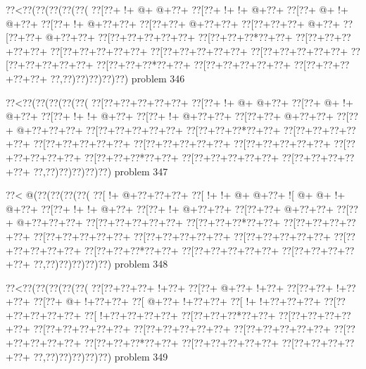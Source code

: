 \vbox{\vbox{\goo
\0??<\0??(\0??(\0??(\0??(\0??(
\0??[\0??+\- !+\- @+\- @+\0??+
\0??[\0??+\- !+\- !+\- @+\0??+
\0??[\0??+\- @+\- !+\- @+\0??+
\0??[\0??+\- !+\- @+\0??+\0??+
\0??[\0??+\0??+\- @+\0??+\0??+
\0??[\0??+\0??+\0??+\- @+\0??+
\0??[\0??+\0??+\- @+\0??+\0??+
\0??[\0??+\0??+\0??+\0??+\0??+
\0??[\0??+\0??+\0??*\0??+\0??+
\0??[\0??+\0??+\0??+\0??+\0??+
\0??[\0??+\0??+\0??+\0??+\0??+
\0??[\0??+\0??+\0??+\0??+\0??+
\0??[\0??+\0??+\0??+\0??+\0??+
\0??[\0??+\0??+\0??+\0??+\0??+
\0??[\0??+\0??+\0??*\0??+\0??+
\0??[\0??+\0??+\0??+\0??+\0??+
\0??[\0??+\0??+\0??+\0??+\0??+
\0??,\0??)\0??)\0??)\0??)\0??)
}
\hfil problem 346\hfil\break
}

\vbox{\vbox{\goo
\0??<\0??(\0??(\0??(\0??(\0??(
\0??[\0??+\0??+\0??+\0??+\0??+
\0??[\0??+\- !+\- @+\- @+\0??+
\0??[\0??+\- @+\- !+\- @+\0??+
\0??[\0??+\- !+\- !+\- @+\0??+
\0??[\0??+\- !+\- @+\0??+\0??+
\0??[\0??+\0??+\- @+\0??+\0??+
\0??[\0??+\- @+\0??+\0??+\0??+
\0??[\0??+\0??+\0??+\0??+\0??+
\0??[\0??+\0??+\0??*\0??+\0??+
\0??[\0??+\0??+\0??+\0??+\0??+
\0??[\0??+\0??+\0??+\0??+\0??+
\0??[\0??+\0??+\0??+\0??+\0??+
\0??[\0??+\0??+\0??+\0??+\0??+
\0??[\0??+\0??+\0??+\0??+\0??+
\0??[\0??+\0??+\0??*\0??+\0??+
\0??[\0??+\0??+\0??+\0??+\0??+
\0??[\0??+\0??+\0??+\0??+\0??+
\0??,\0??)\0??)\0??)\0??)\0??)
}
\hfil problem 347\hfil\break
}

\vbox{\vbox{\goo
\0??<\- @(\0??(\0??(\0??(\0??(
\0??[\- !+\- @+\0??+\0??+\0??+
\0??[\- !+\- !+\- @+\- @+\0??+
\- ![\- @+\- @+\- !+\- @+\0??+
\0??[\0??+\- !+\- !+\- @+\0??+
\0??[\0??+\- !+\- @+\0??+\0??+
\0??[\0??+\0??+\- @+\0??+\0??+
\0??[\0??+\- @+\0??+\0??+\0??+
\0??[\0??+\0??+\0??+\0??+\0??+
\0??[\0??+\0??+\0??*\0??+\0??+
\0??[\0??+\0??+\0??+\0??+\0??+
\0??[\0??+\0??+\0??+\0??+\0??+
\0??[\0??+\0??+\0??+\0??+\0??+
\0??[\0??+\0??+\0??+\0??+\0??+
\0??[\0??+\0??+\0??+\0??+\0??+
\0??[\0??+\0??+\0??*\0??+\0??+
\0??[\0??+\0??+\0??+\0??+\0??+
\0??[\0??+\0??+\0??+\0??+\0??+
\0??,\0??)\0??)\0??)\0??)\0??)
}
\hfil problem 348\hfil\break
}

\vbox{\vbox{\goo
\0??<\0??(\0??(\0??(\0??(\0??(
\0??[\0??+\0??+\0??+\- !+\0??+
\0??[\0??+\- @+\0??+\- !+\0??+
\0??[\0??+\0??+\- !+\0??+\0??+
\0??[\0??+\- @+\- !+\0??+\0??+
\0??[\- @+\0??+\- !+\0??+\0??+
\0??[\- !+\- !+\0??+\0??+\0??+
\0??[\0??+\0??+\0??+\0??+\0??+
\0??[\- !+\0??+\0??+\0??+\0??+
\0??[\0??+\0??+\0??*\0??+\0??+
\0??[\0??+\0??+\0??+\0??+\0??+
\0??[\0??+\0??+\0??+\0??+\0??+
\0??[\0??+\0??+\0??+\0??+\0??+
\0??[\0??+\0??+\0??+\0??+\0??+
\0??[\0??+\0??+\0??+\0??+\0??+
\0??[\0??+\0??+\0??*\0??+\0??+
\0??[\0??+\0??+\0??+\0??+\0??+
\0??[\0??+\0??+\0??+\0??+\0??+
\0??,\0??)\0??)\0??)\0??)\0??)
}
\hfil problem 349\hfil\break
}

